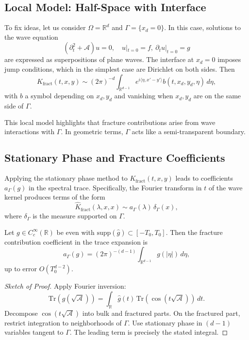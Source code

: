 \subsection{Local Model: Half-Space with Interface}

To fix ideas, let us consider $\Omega = \mathbb{R}^d$ and $\Gamma = \{x_d=0\}$.
In this case, solutions to the wave equation
\[
(\partial_t^2 + \mathcal{A}) u = 0, \quad u|_{t=0}=f, \ \partial_t u|_{t=0}=g
\]
are expressed as superpositions of plane waves. The interface at $x_d=0$
imposes jump conditions, which in the simplest case are Dirichlet on both
sides. Then
\[
K_{\mathrm{fract}}(t,x,y) \sim (2\pi)^{-d} 
\int_{\mathbb{R}^{d-1}} e^{i \langle \eta, x'-y'\rangle}
b(t,x_d,y_d,\eta) \, d\eta,
\]
with $b$ a symbol depending on $x_d,y_d$ and vanishing when $x_d,y_d$
are on the same side of $\Gamma$.

\begin{remark}
This local model highlights that fracture contributions arise from
wave interactions with $\Gamma$. In geometric terms, $\Gamma$ acts
like a semi-transparent boundary.
\end{remark}

\subsection{Stationary Phase and Fracture Coefficients}

Applying the stationary phase method to $K_{\mathrm{fract}}(t,x,y)$
leads to coefficients $a_\Gamma(g)$ in the spectral trace. Specifically,
the Fourier transform in $t$ of the wave kernel produces terms of the form
\[
\widehat{K}_{\mathrm{fract}}(\lambda,x,x) \sim 
a_\Gamma(\lambda)\, \delta_\Gamma(x),
\]
where $\delta_\Gamma$ is the measure supported on $\Gamma$.

\begin{theorem}
\label{thm:fracture-coefficient}
Let $g \in C_c^\infty(\mathbb{R})$ be even with $\mathrm{supp}(\hat g) \subset [-T_0,T_0]$.
Then the fracture contribution coefficient in the trace expansion is
\[
a_\Gamma(g) = (2\pi)^{-(d-1)} \int_{\mathbb{R}^{d-1}} g(|\eta|) \, d\eta,
\]
up to error $O(T_0^{d-2})$.
\end{theorem}

\begin{proof}[Sketch of Proof]
Apply Fourier inversion:
\[
\mathrm{Tr}(g(\sqrt{\mathcal{A}})) = \int_{\mathbb{R}} \hat g(t)\,
\mathrm{Tr}(\cos(t\sqrt{\mathcal{A}}))\, dt.
\]
Decompose $\cos(t\sqrt{\mathcal{A}})$ into bulk and fractured parts.
On the fractured part, restrict integration to neighborhoods of $\Gamma$.
Use stationary phase in $(d-1)$ variables tangent to $\Gamma$. The leading
term is precisely the stated integral.
\end{proof}

